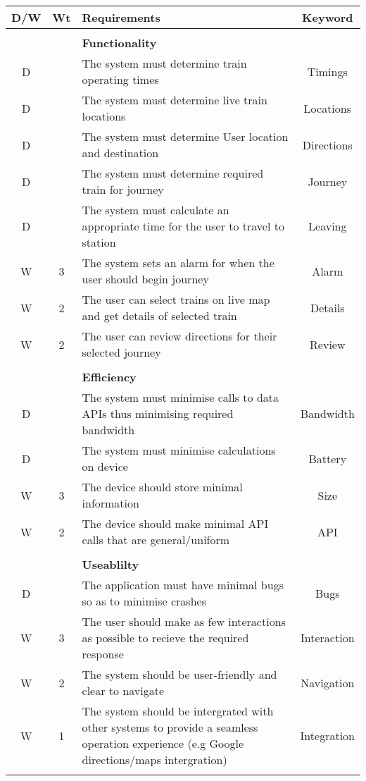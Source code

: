 \documentclass[paper=a4, fontsize=12pt]{scrartcl} %
\numberwithin{equation}{section} %
\numberwithin{figure}{section} %
\numberwithin{table}{section} %
\begin{document}
        \begin{center}
        \begin{tabular}{|| c | c || p{12cm} || c ||}
            \hline
            \textbf{D/W} & \textbf{Wt} & \textbf{Requirements} & \textbf{Keyword} \\
            \hline
            &&&\\
            && \textbf{Functionality} & \\
            \hline
            D && The system must determine train operating times & Timings \\
            D && The system must determine live train locations & Locations \\
            D && The system must determine User location and destination &  Directions \\
            D && The system must determine required train for journey & Journey \\
            D && The system must calculate an appropriate time for the user to travel to station & Leaving \\

            W & 3 & The system sets an alarm for when the user should begin journey & Alarm \\
            W & 2 & The user can select trains on live map and get details of selected train & Details \\
            W & 2 & The user can review directions for their selected journey & Review \\
            &&&\\

            && \textbf{Efficiency} & \\
            \hline
            D && The system must minimise calls to data APIs thus minimising required bandwidth & Bandwidth \\
            D && The system must minimise calculations on device & Battery \\
            W & 3 & The device should store minimal information & Size \\
            W & 2 & The device should make minimal API calls that are general/uniform & API \\
            &&&\\

            && \textbf{Useablilty} & \\
            \hline
            D && The application must have minimal bugs so as to minimise crashes & Bugs \\
            W & 3 & The user should make as few interactions as possible to recieve the required response & Interaction \\
            W & 2 & The system should be user-friendly and clear to navigate & Navigation \\
            W & 1 & The system should be intergrated with other systems to provide a seamless operation experience (e.g Google directions/maps intergration) & Integration \\
            &&&\\


\end{tabular}
\end{center}
\end{document}
